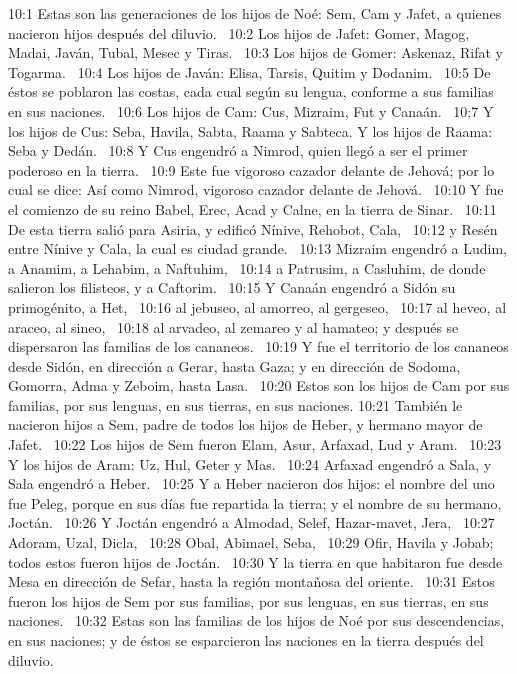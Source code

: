 10:1 Estas son las generaciones de los hijos de Noé: Sem, Cam y Jafet, a quienes nacieron hijos después del diluvio.  
10:2 Los hijos de Jafet: Gomer, Magog, Madai, Javán, Tubal, Mesec y Tiras.  
10:3 Los hijos de Gomer: Askenaz, Rifat y Togarma.  
10:4 Los hijos de Javán: Elisa, Tarsis, Quitim y Dodanim.  
10:5 De éstos se poblaron las costas, cada cual según su lengua, conforme a sus familias en sus naciones.  
10:6 Los hijos de Cam: Cus, Mizraim, Fut y Canaán.  
10:7 Y los hijos de Cus: Seba, Havila, Sabta, Raama y Sabteca. Y los hijos de Raama: Seba y Dedán.  
10:8 Y Cus engendró a Nimrod, quien llegó a ser el primer poderoso en la tierra.  
10:9 Este fue vigoroso cazador delante de Jehová; por lo cual se dice: Así como Nimrod, vigoroso cazador delante de Jehová.  
10:10 Y fue el comienzo de su reino Babel, Erec, Acad y Calne, en la tierra de Sinar.  
10:11 De esta tierra salió para Asiria, y edificó Nínive, Rehobot, Cala,  
10:12 y Resén entre Nínive y Cala, la cual es ciudad grande.  
10:13 Mizraim engendró a Ludim, a Anamim, a Lehabim, a Naftuhim,  
10:14 a Patrusim, a Casluhim, de donde salieron los filisteos, y a Caftorim.  
10:15 Y Canaán engendró a Sidón su primogénito, a Het,  
10:16 al jebuseo, al amorreo, al gergeseo,  
10:17 al heveo, al araceo, al sineo,  
10:18 al arvadeo, al zemareo y al hamateo; y después se dispersaron las familias de los cananeos.  
10:19 Y fue el territorio de los cananeos desde Sidón, en dirección a Gerar, hasta Gaza; y en dirección de Sodoma, Gomorra, Adma y Zeboim, hasta Lasa.  
10:20 Estos son los hijos de Cam por sus familias, por sus lenguas, en sus tierras, en sus naciones. 
10:21 También le nacieron hijos a Sem, padre de todos los hijos de Heber, y hermano mayor de Jafet.  
10:22 Los hijos de Sem fueron Elam, Asur, Arfaxad, Lud y Aram.  
10:23 Y los hijos de Aram: Uz, Hul, Geter y Mas.  
10:24 Arfaxad engendró a Sala, y Sala engendró a Heber.  
10:25 Y a Heber nacieron dos hijos: el nombre del uno fue Peleg, porque en sus días fue repartida la tierra; y el nombre de su hermano, Joctán.  
10:26 Y Joctán engendró a Almodad, Selef, Hazar-mavet, Jera,  
10:27 Adoram, Uzal, Dicla,  
10:28 Obal, Abimael, Seba,  
10:29 Ofir, Havila y Jobab; todos estos fueron hijos de Joctán.  
10:30 Y la tierra en que habitaron fue desde Mesa en dirección de Sefar, hasta la región montañosa del oriente.  
10:31 Estos fueron los hijos de Sem por sus familias, por sus lenguas, en sus tierras, en sus naciones.  
10:32 Estas son las familias de los hijos de Noé por sus descendencias, en sus naciones; y de éstos se esparcieron las naciones en la tierra después del diluvio. 
